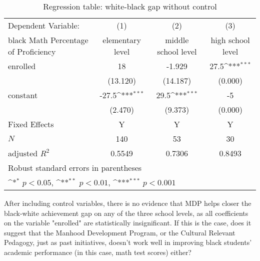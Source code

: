 \begin{table}[H]\centering
\def\sym#1{\ifmmode^{#1}\else\(^{#1}\)\fi}
\caption{Regression table: white-black gap without control\label{tab1}}
\begin{tabular}{l*{3}{c}}
\hline\hline
  Dependent Variable: &\multicolumn{1}{c}{(1)}&\multicolumn{1}{c}{(2)}&\multicolumn{1}{c}{(3)}\\
black Math Percentage of Proficiency            &\multicolumn{1}{c}{elementary level}&\multicolumn{1}{c}{middle school level}&\multicolumn{1}{c}{high school level}\\
\hline
enrolled    &      18        &       -1.929         &      27.5\sym{***} \\
            &     (13.120)         &     (14.187)         &     (0.000)         \\
[1em]
constant      &       -27.5\sym{***}&       29.5\sym{***}&       -5\\
            &     (2.470)         &     (9.373)         &     (0.000)         \\
\hline
Fixed Effects   &    Y     &Y&Y \\
\hline
\(N\)       &         140         &          53         &          30         \\
adjusted \(R^{2}\)&       0.5549         &       0.7306         &       0.8493         \\
\hline\hline
\multicolumn{4}{l}{\footnotesize Robust standard errors in parentheses}\\
\multicolumn{4}{l}{\footnotesize \sym{*} \(p<0.05\), \sym{**} \(p<0.01\), \sym{***} \(p<0.001\)}\\
\end{tabular}
\end{table}

After including control variables, there is no evidence that MDP helps closer the black-white achievement gap on any of the three school levels, as all coefficients on the variable "enrolled" are statistically insignificant. If this is the case, does it suggest that the Manhood Development Program, or the Cultural Relevant Pedagogy, just as past initiatives, doesn't work well in improving black students' academic performance (in this case, math test scores) either?


